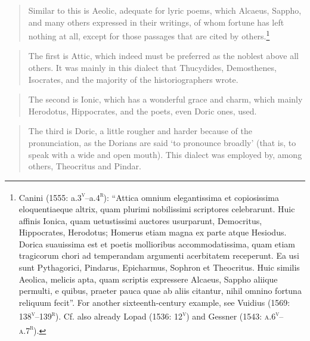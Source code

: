 \begin{quote}
Similar to this is Aeolic, adequate for lyric poems, which Alcaeus, Sappho, and many others expressed in their writings, of whom fortune has left nothing at all, except for those passages that are cited by others.\footnote{Canini (1555: a.3\textsc{\textsuperscript{v}}–a.4\textsc{\textsuperscript{r}}): “Attica omnium elegantissima et copiosissima eloquentiaeque altrix, quam plurimi nobilissimi scriptores celebrarunt. Huic affinis Ionica, quam uetustissimi auctores usurparunt, Democritus, Hippocrates, Herodotus; Homerus etiam magna ex parte atque Hesiodus. Dorica suauissima est et poetis mollioribus accommodatissima, quam etiam tragicorum chori ad temperandam argumenti acerbitatem receperunt. Ea usi sunt Pythagorici, Pindarus, Epicharmus, Sophron et Theocritus. Huic similis Aeolica, melicis apta, quam scriptis expressere Alcaeus, Sappho aliique permulti, e quibus, praeter pauca quae ab aliis citantur, nihil omnino fortuna reliquum fecit”. For another sixteenth-century example, see Vuidius (1569: 138\textsc{\textsuperscript{v}}–139\textsc{\textsuperscript{r}}). Cf. also already Lopad (1536: 12\textsc{\textsuperscript{v}}) and Gessner (1543: \textsc{a.6}\textsc{\textsuperscript{v}}\textsc{–a.7}\textsc{\textsuperscript{r}}).}
\end{quote}

\begin{quote}
The first is Attic, which indeed must be preferred as the noblest above all others. It was mainly in this dialect that Thucydides, Demosthenes, Isocrates, and the majority of the historiographers wrote.
\end{quote}

\begin{quote}
The second is Ionic, which has a wonderful grace and charm, which mainly Herodotus, Hippocrates, and the poets, even Doric ones, used.
\end{quote}

\begin{quote}
The third is Doric, a little rougher and harder because of the pronunciation, as the Dorians are said ‘to pronounce broadly’ (that is, to speak with a wide and open mouth). This dialect was employed by, among others, Theocritus and Pindar.
\end{quote}

